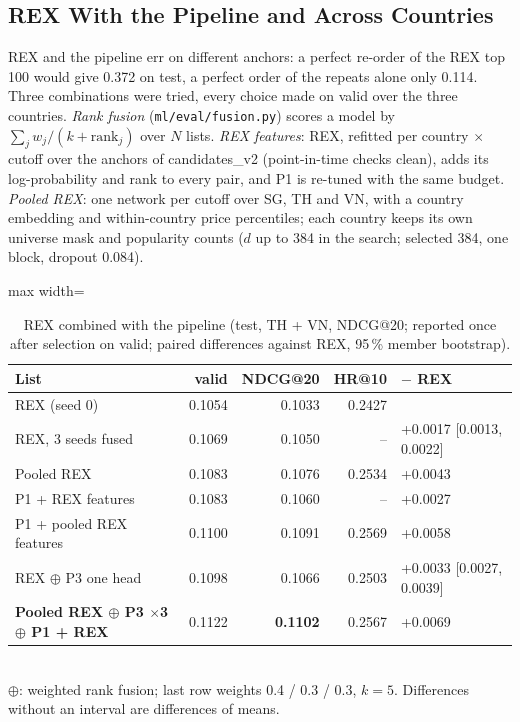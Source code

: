 \documentclass{ieeeaccess}
\begin{document}
\subsection{REX With the Pipeline and Across Countries}
\label{sec:hybrid}
REX and the pipeline err on different anchors: a perfect re-order of the REX top 100 would give 0.372 on test, a perfect order of
the repeats alone only 0.114. Three combinations were tried, every choice made on valid over the three countries. \emph{Rank
fusion} (\texttt{ml/eval/fusion.py}) scores a model by $\sum_j w_j / (k + \mathrm{rank}_j)$ over $N$ lists. \emph{REX features}:
REX, refitted per country $\times$ cutoff over the anchors of candidates\_v2 (point-in-time checks clean), adds its log-probability
and rank to every pair, and P1 is re-tuned with the same budget. \emph{Pooled REX}: one network per cutoff over SG, TH and VN, with
a country embedding and within-country price percentiles; each country keeps its own universe mask and popularity counts
($d$ up to 384 in the search; selected 384, one block, dropout 0.084).

\begin{table}[t]
\caption{REX combined with the pipeline (test, TH + VN, NDCG@20; reported once after selection on valid; paired differences
against REX, 95\,\% member bootstrap).}
\label{tab:hybrid}
\setlength{\tabcolsep}{3pt}
\centering
\begin{adjustbox}{max width=\columnwidth}
\begin{tabular}{lrrrl}
\toprule
List & valid & NDCG@20 & HR@10 & $-$ REX \\
\midrule
REX (seed 0)                                   & 0.1054 & 0.1033 & 0.2427 & \\
REX, 3 seeds fused                             & 0.1069 & 0.1050 & --     & +0.0017 [0.0013, 0.0022] \\
Pooled REX                                     & 0.1083 & 0.1076 & 0.2534 & +0.0043 \\
P1 + REX features                              & 0.1083 & 0.1060 & --     & +0.0027 \\
P1 + pooled REX features                       & 0.1100 & 0.1091 & 0.2569 & +0.0058 \\
REX $\oplus$ P3 one head                       & 0.1098 & 0.1066 & 0.2503 & +0.0033 [0.0027, 0.0039] \\
\textbf{Pooled REX $\oplus$ P3 $\times$3 $\oplus$ P1 + REX} & 0.1122 & \textbf{0.1102} & 0.2567 & +0.0069 \\
\bottomrule
\end{tabular}
\end{adjustbox}
\\[1ex]
{\footnotesize $\oplus$: weighted rank fusion; last row weights 0.4 / 0.3 / 0.3, $k = 5$. Differences without an interval are
differences of means.}
\end{table}
\end{document}
